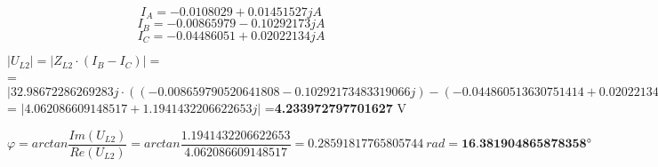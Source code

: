 \[
  I_A = 
-0.0108029 +0.01451527j A
\]
\[
  I_B = 
 -0.00865979-0.10292173j A 
\]
\[
  I_C =
 -0.04486051+0.02022134j A 
\]

  $|U_{L2}| = |Z_{L2} \cdot (I_B-I_C)|=$\\
  = $|32.98672286269283j\cdot((-0.008659790520641808-0.10292173483319066j)-(-0.044860513630751414+0.020221343855072654j))|$
  = $|4.062086609148517+1.1941432206622653j|$
  =\textbf{4.233972797701627} V

  \[
    \varphi = arctan \displaystyle\frac{Im(U_{L2})}{Re(U_{L2})}
    = arctan \displaystyle\frac{1.1941432206622653}{4.062086609148517}
    = 0.28591817765805744\ rad
    = \textbf{16.381904865878358}\si\degree
  \]

